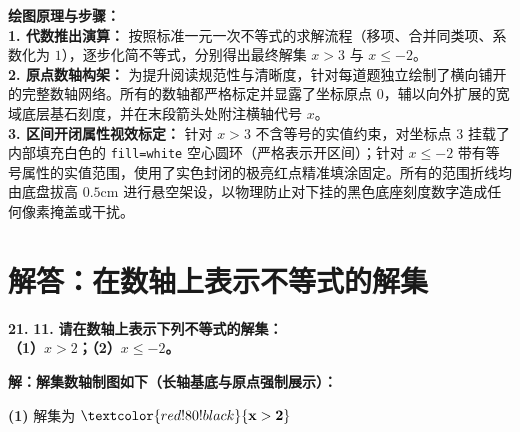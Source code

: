 \vspace{0.4cm}
{\small\color{blue!70!black}
\textbf{绘图原理与步骤：}\\
\textbf{1. 代数推出演算：} 按照标准一元一次不等式的求解流程（移项、合并同类项、系数化为 $1$），逐步化简不等式，分别得出最终解集 $x > 3$ 与 $x \leqslant -2$。\\
\textbf{2. 原点数轴构架：} 为提升阅读规范性与清晰度，针对每道题独立绘制了横向铺开的完整数轴网络。所有的数轴都严格标定并显露了坐标原点 $0$，辅以向外扩展的宽域底层基石刻度，并在末段箭头处附注横轴代号 $x$。\\
\textbf{3. 区间开闭属性视效标定：} 针对 $x > 3$ 不含等号的实值约束，对坐标点 $3$ 挂载了内部填充白色的 \texttt{fill=white} 空心圆环（严格表示开区间）；针对 $x \leqslant -2$ 带有等号属性的实值范围，使用了实色封闭的极亮红点精准填涂固定。所有的范围折线均由底盘拔高 $0.5\mathrm{cm}$ 进行悬空架设，以物理防止对下挂的黑色底座刻度数字造成任何像素掩盖或干扰。
}

\newpage



\section{解答：在数轴上表示不等式的解集}

\vspace{0.6cm}

\textbf{\LARGE 21.} \textbf{\color{cyan!80!blue} 11. }\textbf{请在数轴上表示下列不等式的解集：\\
（1）$x > 2$；\hspace{4cm}（2）$x \leqslant -2$。}

\vspace{0.4cm}
\textbf{解：解集数轴制图如下（长轴基底与原点强制展示）：}

\vspace{0.4cm}
\noindent \textbf{(1)} 解集为 $\textcolor{red!80!black}{\mathbf{x > 2}}$ \par\vspace{0.2cm}
\begin{center}
\end{center}

